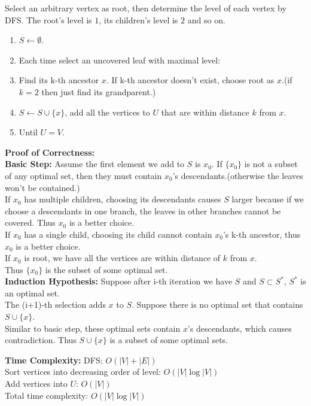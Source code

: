 \documentclass{oxmathproblems}
\begin{document}
\begin{questions}
\miquestion
Select an arbitrary vertex as root, then determine the level of each vertex by DFS. The root's level is $1$, its children's level is $2$ and so on.
\begin{enumerate}
    \item $S\gets\emptyset$.
    \item Each time select an uncovered leaf with maximal level:
    \item \hspace{0.5cm} Find its k-th ancestor $x$. If k-th ancestor doesn't exist, choose root as $x$.(if $k=2$ then just find its grandparent.)
    \item \hspace{0.5cm} $S\gets S\cup\{x\}$, add all the vertices to $U$ that are within distance $k$ from $x$.
    \item Until $U=V$.
\end{enumerate}
\textbf{Proof of Correctness: }\\
\textbf{Basic Step: }Assume the first element we add to $S$ is $x_0$. If $\{x_0\}$ is not a subset of any optimal set, then they must contain $x_0$'s descendants.(otherwise the leaves won't be contained.)\\
If $x_0$ has multiple children, choosing its descendants causes $S$ larger because if we choose a descendants in one branch, the leaves in other branches cannot be covered. Thus $x_0$ is a better choice.\\
If $x_0$ has a single child, choosing its child cannot contain $x_0$'s k-th ancestor, thus $x_0$ is a better choice.\\
If $x_0$ is root, we have all the vertices are within distance of $k$ from $x$.\\
Thus $\{x_0\}$ is the subset of some optimal set.\\
\textbf{Induction Hypothesis: }Suppose after i-th iteration we have $S$ and $S\subset S^*$, $S^*$ is an optimal set.\\
The (i+1)-th selection adds $x$ to $S$. Suppose there is no optimal set that contains $S\cup\{x\}$.\\
Similar to basic step, these optimal sets contain $x$'s descendants, which causes contradiction. Thus $S\cup\{x\}$ is a subset of some optimal sets.
\par
\textbf{Time Complexity: }
DFS: $O(|V|+|E|)$\\
Sort vertices into decreasing order of level: $O(|V|\log |V|)$\\
Add vertices into $U$: $O(|V|)$\\
Total time complexity: $O(|V|\log |V|)$


\end{questions}
\end{document}
